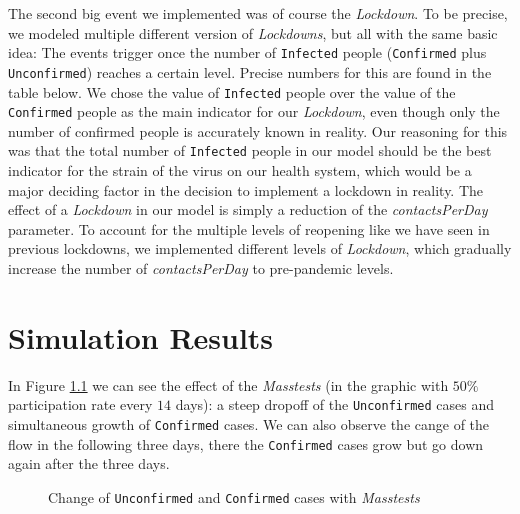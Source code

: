 \documentclass
[
    report,
    11pt,
    bibliography = totoc,
    listof = totoc,
    headinclude = true,
]
{scrreport}
\begin{document}
The second big event we implemented was of course the \textit{Lockdown}. To be precise,
we modeled multiple different version of \textit{Lockdowns}, but all with the same basic idea:
The events trigger once the number of \texttt{Infected} people (\texttt{Confirmed} plus \texttt{Unconfirmed})
reaches a certain level. Precise numbers for this are found in the table below.
We chose the value of \texttt{Infected} people over the value of
the \texttt{Confirmed} people as the main indicator for our \textit{Lockdown}, even though only the number of confirmed people is accurately known in reality.
Our reasoning for this was that the total number of \texttt{Infected} people in our
model should be the best indicator for the strain of the virus on our health system,
which would be a major deciding factor in the decision to implement a lockdown in reality.
The effect of a \textit{Lockdown} in our model is simply a reduction of the \textit{contactsPerDay} parameter.
To account for the multiple levels of reopening like we have seen in previous
lockdowns, we implemented different levels of \textit{Lockdown}, which gradually increase
the number of \textit{contactsPerDay} to pre-pandemic levels.


\begingroup
\renewcommand{\cleardoublepage}{}
\renewcommand{\clearpage}{}
\chapter{Simulation Results}
\endgroup

In Figure \ref{uncon&con} we can see the effect of the \textit{Masstests} (in the graphic with $50 \%$ participation rate every $14$ days): a steep dropoff of the \texttt{Unconfirmed} cases and simultaneous growth of \texttt{Confirmed} cases. We can also observe the cange of the flow in the following three days, there the \texttt{Confirmed} cases grow but go down again after the three days.

\begin{figure}[!h]
  \centering
  \qquad
  \caption{Change of \texttt{Unconfirmed} and \texttt{Confirmed} cases with \textit{Masstests}}%
  \label{uncon&con}
\end{figure}
\end{document}
